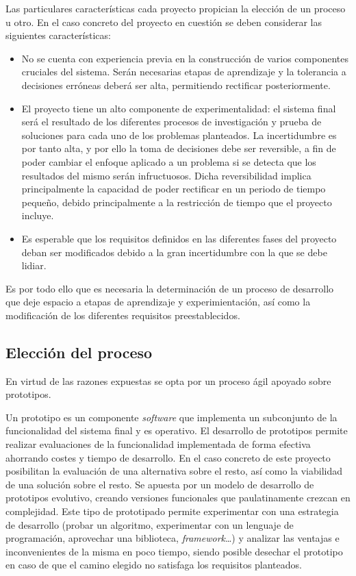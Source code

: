 Las particulares características cada proyecto propician la elección de un proceso u otro. En el caso concreto del proyecto en cuestión se deben considerar las siguientes características:

\begin{itemize}

\item No se cuenta con experiencia previa en la construcción de varios componentes cruciales del sistema. Serán necesarias etapas de aprendizaje y la tolerancia a decisiones erróneas deberá ser alta, permitiendo rectificar posteriormente.

\item El proyecto tiene un alto componente de experimentalidad: el sistema final será el resultado de los diferentes procesos de investigación y prueba de soluciones para cada uno de los problemas planteados. La incertidumbre es por tanto alta, y por ello la toma de decisiones debe ser reversible, a fin de poder cambiar el enfoque aplicado a un problema si se detecta que los resultados del mismo serán infructuosos. Dicha reversibilidad implica principalmente la capacidad de poder rectificar en un periodo de tiempo pequeño, debido principalmente a la restricción de tiempo que el proyecto incluye.

\item Es esperable que los requisitos definidos en las diferentes fases del proyecto deban ser modificados debido a la gran incertidumbre con la que se debe lidiar.

\end{itemize}

Es por todo ello que es necesaria la determinación de un proceso de desarrollo que deje espacio a etapas de aprendizaje y experimientación, así como la modificación de los diferentes requisitos preestablecidos. 

\subsection{Elección del proceso}

En virtud de las razones expuestas se opta por un proceso ágil apoyado sobre prototipos. 

Un prototipo es un componente \textit{software} que implementa un subconjunto de la funcionalidad del sistema final y es operativo. El desarrollo de prototipos permite realizar evaluaciones de la funcionalidad implementada de forma efectiva ahorrando costes y tiempo de desarrollo. En el caso concreto de este proyecto posibilitan la evaluación de una alternativa sobre el resto, así como la viabilidad de una solución sobre el resto. Se apuesta por un modelo de desarrollo de prototipos evolutivo\cite{10.1109/TSE.1975.6312870}, creando versiones funcionales que paulatinamente crezcan en complejidad. Este tipo de prototipado permite experimentar con una estrategia de desarrollo (probar un algoritmo, experimentar con un lenguaje de programación, aprovechar una biblioteca, \textit{framework}\dots) y analizar las ventajas e inconvenientes de la misma en poco tiempo, siendo posible desechar el prototipo en caso de que el camino elegido no satisfaga los requisitos planteados.

